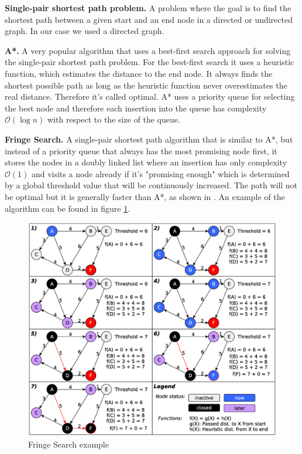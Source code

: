 \documentclass[letterpaper]{article}
\newcommand{\mypar}[1]{{\bf #1.}}
\begin{document}
\mypar{Single-pair shortest path problem}
A problem where the goal is to find the shortest path between a given start and an end node in a directed or undirected graph. In our case we used a directed graph.

\mypar{A*}
A very popular algorithm that uses a best-first search approach for solving the single-pair shortest path problem. For the best-first search it uses a heuristic function, which estimates the distance to the end node. It always finds the shortest possible path as long as the heuristic function never overestimates the real distance. Therefore it's called optimal. A* uses a priority queue for selecting the best node and therefore each insertion into the queue has complexity $\mathcal{O}(\log n)$ with respect to the size of the queue.

\mypar{Fringe Search}
A single-pair shortest path algorithm that is similar to A*, but instead of a priority queue that always has the most promising node first, it stores the nodes in a doubly linked list where an insertion has only complexity $\mathcal{O}(1)$ and visits a node already if it's "promising enough" which is determined by a global threshold value that will be continuously increased. The path will not be optimal but it is generally faster than A*, as shown in \cite{fringe:05}. An example of the algorithm can be found in figure \ref{fig:algo}.
\begin{figure}[h]\centering
  \includegraphics[scale=0.245]{fringe_rep.eps}
  \caption{Fringe Search example \label{fig:algo}}
\end{figure}
\end{document}
